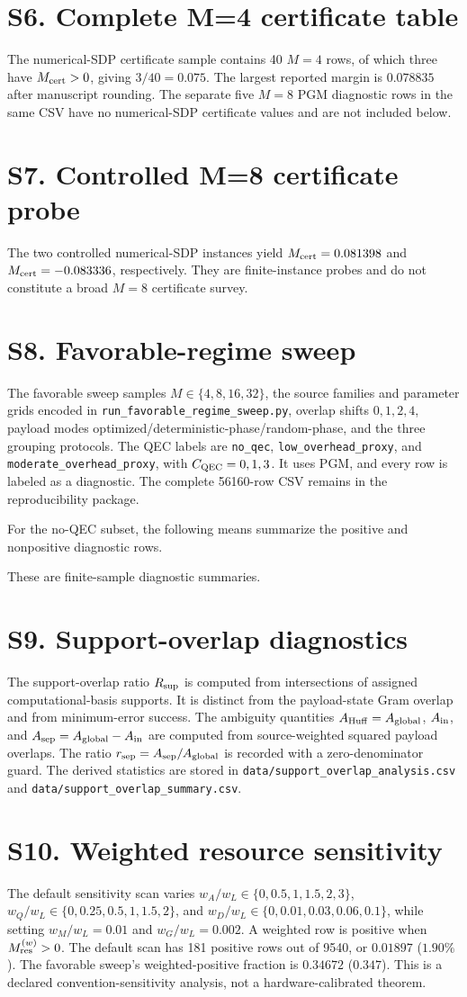 \documentclass[10pt]{article}
\newcommand{\suppsection}[1]{\section*{#1}}
\begin{document}
\suppsection{S6. Complete M=4 certificate table}
The numerical-SDP certificate sample contains 40 $M=4$ rows, of which three have $M_{\rm cert}>0$, giving $3/40=0.075$. The largest reported margin is $0.078835$ after manuscript rounding. The separate five $M=8$ PGM diagnostic rows in the same CSV have no numerical-SDP certificate values and are not included below.
\begin{landscape}\scriptsize


\end{landscape}

\suppsection{S7. Controlled M=8 certificate probe}
The two controlled numerical-SDP instances yield $M_{\rm cert}=0.081398$ and $M_{\rm cert}=-0.083336$, respectively. They are finite-instance probes and do not constitute a broad $M=8$ certificate survey.


\suppsection{S8. Favorable-regime sweep}
The favorable sweep samples $M\in\{4,8,16,32\}$, the source families and parameter grids encoded in \texttt{run\_favorable\_regime\_sweep.py}, overlap shifts $0,1,2,4$, payload modes optimized/deterministic-phase/random-phase, and the three grouping protocols. The QEC labels are \texttt{no\_qec}, \texttt{low\_overhead\_proxy}, and \texttt{moderate\_overhead\_proxy}, with $C_{\rm QEC}=0,1,3$. It uses PGM, and every row is labeled as a diagnostic. The complete 56160-row CSV remains in the reproducibility package.

For the no-QEC subset, the following means summarize the positive and nonpositive diagnostic rows.

These are finite-sample diagnostic summaries.

\suppsection{S9. Support-overlap diagnostics}
The support-overlap ratio $R_{\rm sup}$ is computed from intersections of assigned computational-basis supports. It is distinct from the payload-state Gram overlap and from minimum-error success. The ambiguity quantities $A_{\rm Huff}=A_{\rm global}$, $A_{\rm in}$, and $A_{\rm sep}=A_{\rm global}-A_{\rm in}$ are computed from source-weighted squared payload overlaps. The ratio $r_{\rm sep}=A_{\rm sep}/A_{\rm global}$ is recorded with a zero-denominator guard. The derived statistics are stored in \texttt{data/support\_overlap\_analysis.csv} and \texttt{data/support\_overlap\_summary.csv}.

\suppsection{S10. Weighted resource sensitivity}
The default sensitivity scan varies $w_A/w_L\in\{0,0.5,1,1.5,2,3\}$, $w_Q/w_L\in\{0,0.25,0.5,1,1.5,2\}$, and $w_D/w_L\in\{0,0.01,0.03,0.06,0.1\}$, while setting $w_M/w_L=0.01$ and $w_G/w_L=0.002$. A weighted row is positive when $M_{\rm res}^{(w)}>0$. The default scan has 181 positive rows out of 9540, or $0.01897$ ($1.90\%$). The favorable sweep's weighted-positive fraction is $0.34672$ ($0.347$). This is a declared convention-sensitivity analysis, not a hardware-calibrated theorem.
\end{document}
